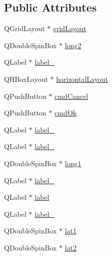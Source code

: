 \subsection*{Public Attributes}
\begin{DoxyCompactItemize}
\item 
Q\+Grid\+Layout $\ast$ \mbox{\hyperlink{class_ui___create_graph_dialog_a9297d40d1ab767f0b5c7182e42c65b7d}{grid\+Layout}}
\item 
Q\+Double\+Spin\+Box $\ast$ \mbox{\hyperlink{class_ui___create_graph_dialog_aecbfe0b9f2e067624118a8441809d5c5}{long2}}
\item 
Q\+Label $\ast$ \mbox{\hyperlink{class_ui___create_graph_dialog_a7a26be6b59add20f297911a497fe44df}{label\+\_}}
\item 
Q\+H\+Box\+Layout $\ast$ \mbox{\hyperlink{class_ui___create_graph_dialog_a5b69c00ae5a5c0d4ff3923a0d6363365}{horizontal\+Layout}}
\item 
Q\+Push\+Button $\ast$ \mbox{\hyperlink{class_ui___create_graph_dialog_a8508b42c2ec5a0aab08ba34c8e99a063}{cmd\+Cancel}}
\item 
Q\+Push\+Button $\ast$ \mbox{\hyperlink{class_ui___create_graph_dialog_aa8305ba8ffc4f330f508b64d399647eb}{cmd\+Ok}}
\item 
Q\+Label $\ast$ \mbox{\hyperlink{class_ui___create_graph_dialog_ae55048574e557b1bc859af707032e30a}{label\+\_}}
\item 
Q\+Label $\ast$ \mbox{\hyperlink{class_ui___create_graph_dialog_af3ee728ec847210e439461aaf69cd687}{label\+\_}}
\item 
Q\+Double\+Spin\+Box $\ast$ \mbox{\hyperlink{class_ui___create_graph_dialog_a5c23c90626c641011a7df3d154f8f1ae}{long1}}
\item 
Q\+Label $\ast$ \mbox{\hyperlink{class_ui___create_graph_dialog_a6181ef1d34472d09fb43fbb668dd1e55}{label\+\_}}
\item 
Q\+Label $\ast$ \mbox{\hyperlink{class_ui___create_graph_dialog_afc7da5394b872fbaa3b062079ebe2a22}{label}}
\item 
Q\+Label $\ast$ \mbox{\hyperlink{class_ui___create_graph_dialog_a51b1f0e9cd74742df055fd68f2a915b2}{label\+\_}}
\item 
Q\+Double\+Spin\+Box $\ast$ \mbox{\hyperlink{class_ui___create_graph_dialog_a2f1dd64659b14d70c1fdad65ffac60cf}{lat1}}
\item 
Q\+Double\+Spin\+Box $\ast$ \mbox{\hyperlink{class_ui___create_graph_dialog_ae9ad18d5ddaa49a803915d582f75d787}{lat2}}
\item 

\end{DoxyCompactItemize}
